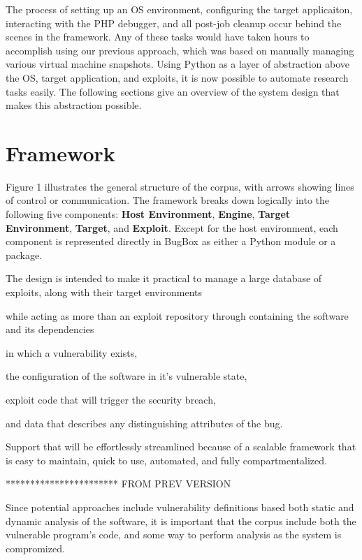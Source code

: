\documentclass[letterpaper,twocolumn,10pt]{article}
\begin{document}
The process of setting up an OS environment, configuring the target applicaiton, interacting with the PHP debugger, and all post-job cleanup occur behind the scenes in the framework. Any of these tasks would have taken hours to accomplish using our previous approach, which was based on manually managing various virtual machine snapshots. Using Python as a layer of abstraction above the OS, target application, and exploits, it is now possible to automate research tasks easily. The following sections give an overview of the system design that makes this abstraction possible.

\section{Framework}

Figure 1 illustrates the general structure of the corpus, with arrows showing lines of control or communication. The framework breaks down logically into the following five components: {\bf Host Environment}, {\bf Engine}, {\bf Target Environment}, {\bf Target}, and {\bf Exploit}. Except for the host environment, each component is represented directly in BugBox as either a Python module or a package.\par

The design is intended to make it practical to manage a large database of exploits, along with their target environments

while acting as more than an exploit repository through containing the software and its dependencies 

in which a vulnerability exists, 

the configuration of the software in it's vulnerable state,

 exploit code that will trigger the security breach, 

and data that describes any distinguishing attributes of the bug.

Support that will be effortlessly streamlined because of a scalable framework that is easy to maintain, quick to use, automated, and fully compartmentalized.  

***********************
FROM PREV VERSION


 Since potential approaches include vulnerability definitions based both static and dynamic analysis of the software, it is important that the corpus include both the vulnerable program's code, and some way to perform analysis as the system is compromized.
\end{document}
